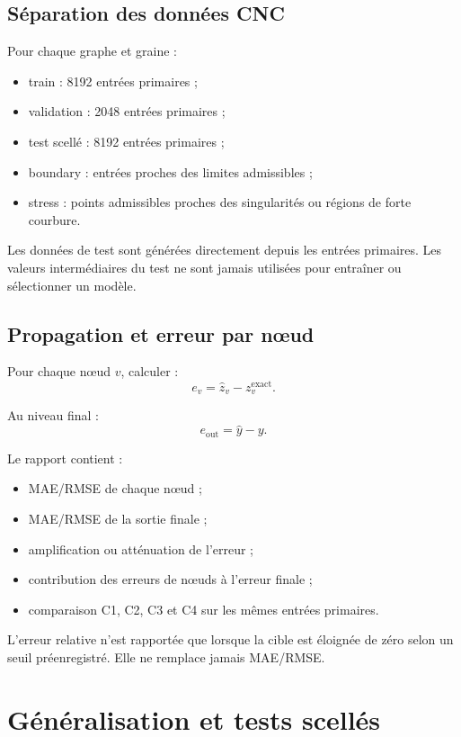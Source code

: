 \documentclass[11pt,a4paper]{article}
\begin{document}
\subsection{Séparation des données CNC}

Pour chaque graphe et graine :
\begin{itemize}
  \item train : 8192 entrées primaires ;
  \item validation : 2048 entrées primaires ;
  \item test scellé : 8192 entrées primaires ;
  \item boundary : entrées proches des limites admissibles ;
  \item stress : points admissibles proches des singularités ou
        régions de forte courbure.
\end{itemize}

Les données de test sont générées directement depuis les entrées
primaires. Les valeurs intermédiaires du test ne sont jamais utilisées
pour entraîner ou sélectionner un modèle.

\subsection{Propagation et erreur par nœud}

Pour chaque nœud $v$, calculer :
\[
e_v=\hat z_v-z_v^{\mathrm{exact}}.
\]

Au niveau final :
\[
e_{\mathrm{out}}=\hat y-y.
\]

Le rapport contient :
\begin{itemize}
  \item MAE/RMSE de chaque nœud ;
  \item MAE/RMSE de la sortie finale ;
  \item amplification ou atténuation de l'erreur ;
  \item contribution des erreurs de nœuds à l'erreur finale ;
  \item comparaison C1, C2, C3 et C4 sur les mêmes entrées primaires.
\end{itemize}

L'erreur relative n'est rapportée que lorsque la cible est éloignée
de zéro selon un seuil préenregistré. Elle ne remplace jamais MAE/RMSE.

\section{Généralisation et tests scellés}
\end{document}
